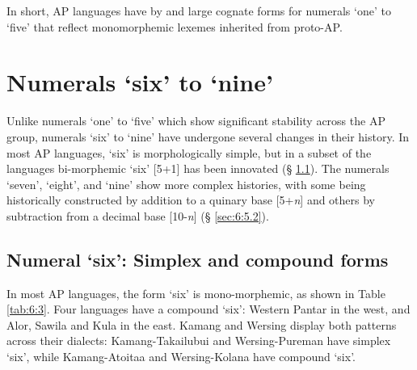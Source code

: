 In short, AP languages have by and large cognate forms for numerals `one' to `five' that reflect monomorphemic lexemes inherited from proto-AP. 

\section{Numerals `six' to `nine'}\label{sec:6:5}
Unlike numerals `one' to `five' which show significant stability across the AP group, numerals `six' to `nine' have undergone several changes in their history. In most AP languages, `six' is morphologically simple, but in a subset of the languages bi-morphemic `six' [5+1] has been innovated ({\S} \ref{sec:6:5.1}). The numerals `seven', `eight', and `nine' show more complex histories, with some being historically constructed by addition to a quinary base [5+\textit{n}] and others by subtraction from a decimal base [10-\textit{n}] ({\S} \ref{sec:6:5.2}). 

\subsection{Numeral `six': Simplex and compound forms} \label{sec:6:5.1}
In most AP languages, the form `six' is mono-morphemic, as shown in Table \ref{tab:6:3}. Four languages have a compound `six': Western Pantar in the west, and Alor, Sawila and Kula in the east. Kamang and Wersing display both patterns across their dialects: Kamang-Takailubui and Wersing-Pureman have simplex `six', while Kamang-Atoitaa and Wersing-Kolana have compound `six'. 

 

